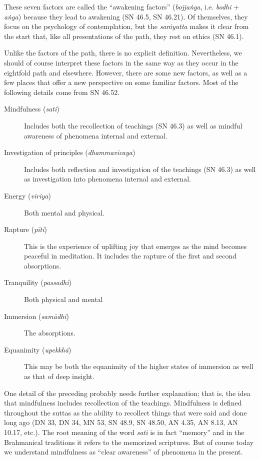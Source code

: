 \documentclass[12pt,openany]{book}%
\begin{document}
These seven factors are called the “awakening factors” (\textit{\textsanskrit{bojjaṅga}}, i.e. \textit{bodhi} + \textit{\textsanskrit{aṅga}}) because they lead to awakening (SN 46.5, SN 46.21). Of themselves, they focus on the psychology of contemplation, but the \textit{\textsanskrit{saṁyutta}} makes it clear from the start that, like all presentations of the path, they rest on ethics (SN 46.1).

Unlike the factors of the path, there is no explicit definition. Nevertheless, we should of course interpret these factors in the same way as they occur in the eightfold path and elsewhere. However, there are some new factors, as well as a few places that offer a new perspective on some familiar factors. Most of the following details come from SN 46.52.

\begin{description}%
\item[Mindfulness (\textit{sati})] Includes both the recollection of teachings (SN 46.3) as well as mindful awareness of phenomena internal and external.%
\item[Investigation of principles (\textit{dhammavicaya})] Includes both reflection and investigation of the teachings (SN 46.3) as well as investigation into phenomena internal and external.%
\item[Energy (\textit{viriya})] Both mental and physical.%
\item[Rapture (\textit{\textsanskrit{pīti}})] This is the experience of uplifting joy that emerges as the mind becomes peaceful in meditation. It includes the rapture of the first and second absorptions.%
\item[Tranquility (\textit{passadhi})] Both physical and mental%
\item[Immersion (\textit{\textsanskrit{samādhi}})] The absorptions.%
\item[Equanimity (\textit{\textsanskrit{upekkhā}})] This may be both the equanimity of the higher states of immersion as well as that of deep insight.%
\end{description}

One detail of the preceding probably needs further explanation; that is, the idea that mindfulness includes recollection of the teachings. Mindfulness is defined throughout the suttas as the ability to recollect things that were said and done long ago (DN 33, DN 34, MN 53, SN 48.9, SN 48.50, AN 4.35, AN 8.13, AN 10.17, etc.). The root meaning of the word \textit{sati} is in fact “memory” and in the Brahmanical traditions it refers to the memorized scriptures. But of course today we understand mindfulness as “clear awareness” of phenomena in the present.
\end{document}
